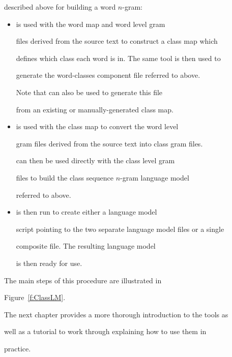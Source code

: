 described above for building a word $n$-gram:


\begin{itemize}


\item {} is used with the word map and word level gram


  files derived from the source text to construct a class map which


  defines which class each word is in.  The same tool is then used to


  generate the word-classes component file referred to above.


  Note that  can also be used to generate this file


  from an existing or manually-generated class map.


     


\item {} is used with the class map to convert the word level 


  gram files derived from the source text into class gram files.  


   can then be used directly with the class level gram


  files to build the class sequence $n$-gram language model


  referred to above.





\item {} is then run to create either a language model


  script pointing to the two separate language model files or a single


  composite file.  The resulting language model


  is then ready for use.


\end{itemize}


The main steps of this procedure are illustrated in


Figure~\ref{f:ClassLM}.





The next chapter provides a more thorough introduction to the tools as


well as a tutorial to work through explaining how to use them in


practice.


